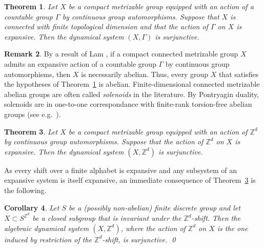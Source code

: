 \documentclass[12pt,a4paper]{amsart}
\newtheorem{theorem}{Theorem}[section]
\newtheorem{corollary}[theorem]{Corollary}
\theoremstyle{definition}
\newtheorem{remark}[theorem]{Remark}
\numberwithin{equation}{section}
\begin{document}
\begin{theorem}
\label{t:th1}
Let $X$ be a  compact metrizable  group equipped with an action of a countable group $\Gamma$ by continuous group automorphisms. Suppose that $X$ is connected with finite topological dimension
and that the action of $\Gamma$ on $X$ is expansive. 
Then the dynamical system $(X,\Gamma)$ is surjunctive.
\end{theorem}

\begin{remark}
\label{r:lam}
By a result of Lam \cite[Theorem~3.2]{lam},
if a compact connected metrizable group $X$ admits an expansive action of a countable group 
$\Gamma$ by continuous group automorphisms,  then $X$ is necessarily abelian.
Thus, every group $X$ that satisfies  the hypotheses of 
 Theorem~\ref{t:th1} is abelian.
 Finite-dimensional connected metrizable abelian groups are often called \emph{solenoids} in the literature. By Pontryagin duality, solenoids are in one-to-one correspondance with finite-rank torsion-free abelian groups (see e.g.~\cite{morris}).
\end{remark}

\begin{theorem}
\label{t:th2}
Let $X$ be a compact metrizable group equipped with an action of  ${\mathbb{Z}}^d$ by continuous group automorphisms.
Suppose that the  action of ${\mathbb{Z}}^d$ on $X$ is expansive.
Then the dynamical system $(X,{\mathbb{Z}}^d)$ is surjunctive.
\end{theorem}

As every shift over a finite alphabet is expansive and any subsystem of an expansive system is itself expansive,
an immediate consequence of Theorem~\ref{t:th2} is the following.

\begin{corollary}
Let $S$ be a (possibly non-abelian) finite discrete group and let $X \subset S^{{\mathbb{Z}}^d}$ be a closed subgroup that is invariant under the ${\mathbb{Z}}^d$-shift.
Then the algebraic dynamical system $(X,{\mathbb{Z}}^d)$, where the action of ${\mathbb{Z}}^d$ on $X$ is the one induced by restriction of the ${\mathbb{Z}}^d$-shift,  is surjunctive.
\qed 
\end{corollary}
\end{document}
